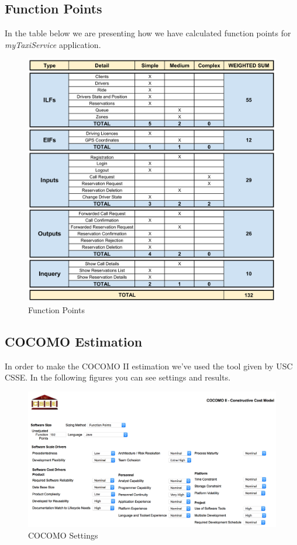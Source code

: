 \documentclass[a4paper]{article}
\begin{document}
\subsection{Function Points}

In the table below we are presenting how we have calculated function points for \emph{myTaxiService} application.

\begin{figure}[H]
\includegraphics[width=.9\textwidth]{FunctionPoints}
\centering
\caption{Function Points}
\label{fig:FunctionPoints}
\end{figure}

\subsection{COCOMO Estimation}

In order to make the COCOMO II estimation we've used the tool given by USC CSSE. In the following figures you can see settings and results.

\begin{figure}[H]
\includegraphics[width=.9\textwidth]{COCOMO-Settings}
\centering
\caption{COCOMO Settings}
\label{fig:COCOMO-Settings}
\end{figure}
\end{document}
